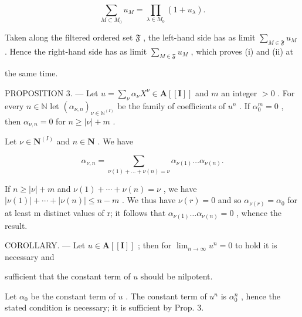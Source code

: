 \[
\sum_ {M \subset M _ {0}} u _ {M} = \prod_ {\lambda \in M _ {0}} (1 + u _ {\lambda}).
\]

Taken along the filtered ordered set \(\mathfrak{F}\) , the left-hand side has as limit \(\sum_{M\in\mathfrak{F}}u_{M}\) . Hence the right-hand side has as limit \(\sum_{M\in\mathfrak{F}}u_{M}\) , which proves (i) and (ii) at

the same time.

PROPOSITION 3. --- Let \(u = \sum_{\nu} \alpha_{\nu} X^{\nu} \in \mathbf{A}[[\mathbf{I}]]\) and \(m\) an integer \(> 0\) . For every \(n \in \mathbb{N}\) let \((\alpha_{\nu, n})_{\nu \in \mathbb{N}^{(I)}}\) be the family of coefficients of \(u^n\) . If \(\alpha_0^m = 0\) , then \(\alpha_{\nu, n} = 0\) for \(n \geqslant |\nu| + m\) .

Let \(\nu \in \mathbf{N}^{(I)}\) and \(n\in \mathbf{N}\) . We have

\[
\alpha_ {\nu , n} = \sum_ {\nu (1) + \dots + \nu (n) = \nu} \alpha_ {\nu (1)} \dots \alpha_ {\nu (n)}.
\]

If \(n \geqslant |\nu| + m\) and \(\nu(1) + \cdots + \nu(n) = \nu\) , we have \(|\nu(1)| + \cdots + |\nu(n)| \leqslant n - m\) . We thus have \(\nu(r) = 0\) and so \(\alpha_{\nu(r)} = \alpha_0\) for at least m distinct values of r; it follows that \(\alpha_{\nu(1)} \ldots \alpha_{\nu(n)} = 0\) , whence the result.

COROLLARY. --- Let \(u \in \mathbf{A}[[\mathbf{I}]]\) ; then for \(\lim_{n \to \infty} u^n = 0\) to hold it is necessary and

sufficient that the constant term of \(u\) should be nilpotent.

Let \(\alpha_0\) be the constant term of \(u\) . The constant term of \(u^n\) is \(\alpha_0^n\) , hence the stated condition is necessary; it is sufficient by Prop. 3.
\relax{}
